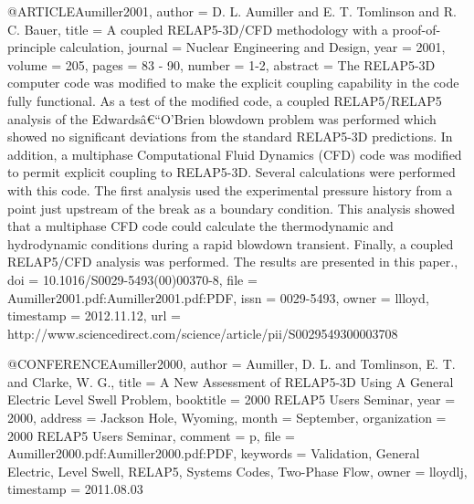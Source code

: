 @ARTICLE{Aumiller2001,
  author = {D. L. Aumiller and E. T. Tomlinson and R. C. Bauer},
  title = {A coupled {RELAP5-3D/CFD} methodology with a proof-of-principle calculation},
  journal = {Nuclear Engineering and Design},
  year = {2001},
  volume = {205},
  pages = {83 - 90},
  number = {1-2},
  abstract = {The RELAP5-3D computer code was modified to make the explicit coupling
	capability in the code fully functional. As a test of the modified
	code, a coupled RELAP5/RELAP5 analysis of the Edwardsâ€“O'Brien blowdown
	problem was performed which showed no significant deviations from
	the standard RELAP5-3D predictions. In addition, a multiphase Computational
	Fluid Dynamics (CFD) code was modified to permit explicit coupling
	to RELAP5-3D. Several calculations were performed with this code.
	The first analysis used the experimental pressure history from a
	point just upstream of the break as a boundary condition. This analysis
	showed that a multiphase CFD code could calculate the thermodynamic
	and hydrodynamic conditions during a rapid blowdown transient. Finally,
	a coupled RELAP5/CFD analysis was performed. The results are presented
	in this paper.},
  doi = {10.1016/S0029-5493(00)00370-8},
  file = {Aumiller2001.pdf:Aumiller2001.pdf:PDF},
  issn = {0029-5493},
  owner = {llloyd},
  timestamp = {2012.11.12},
  url = {http://www.sciencedirect.com/science/article/pii/S0029549300003708}
}

@CONFERENCE{Aumiller2000,
  author = {Aumiller, D. L. and Tomlinson, E. T. and Clarke, W. G.},
  title = {A New Assessment of {RELAP5-3D} Using A General Electric Level Swell
	Problem},
  booktitle = {2000 RELAP5 Users Seminar},
  year = {2000},
  address = {Jackson Hole, Wyoming},
  month = {September},
  organization = {2000 RELAP5 Users Seminar},
  comment = {p},
  file = {Aumiller2000.pdf:Aumiller2000.pdf:PDF},
  keywords = {Validation, General Electric, Level Swell, RELAP5, Systems Codes,
	Two-Phase Flow},
  owner = {lloydlj},
  timestamp = {2011.08.03}
}

